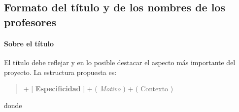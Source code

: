 \subsection*{Formato del título y de los nombres de los profesores}

\paragraph{Sobre el título}

El título debe reflejar y en lo posible destacar el aspecto más importante del proyecto. La estructura propuesta es:

\begin{quote}
 + [ \textbf{Especificidad} ] + ( \textit{Motivo} ) + ( \textsf{Contexto} )
\end{quote}

donde

